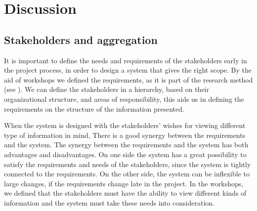 \chapter{Discussion}
\label{chapter:discussion}

\section{Stakeholders and aggregation} %
\label{sec:discussion_stakeholders'_and_aggregation}
It is important to define the needs and requirements of the stakeholders 
early in the project process, in order to design a system that gives the right scope. 
By the aid of workshops we defined the requirements, as it is part of the 
research method (see ). We can define the stakeholders in 
a hierarchy, based on their organizational structure, and areas of 
responsibility, this aids us in defining the requirements on the structure of 
the information presented.

When the system is designed with the stakeholders' wishes for viewing different type of information in mind, There is a good synergy between the requirements and the system. The synergy between the requirements and the system has 
both advantages and disadvantages. On one side the system has a great 
possibility to satisfy the requirements and needs of the stakeholders, since 
the system is tightly connected to the requirements. On the other side, the 
system can be inflexible to large changes, if the requirements change late in 
the project. In the workshops, we defined that the stakeholders must have the 
ability to view different kinds of information and the system must take these 
needs into consideration. \\

